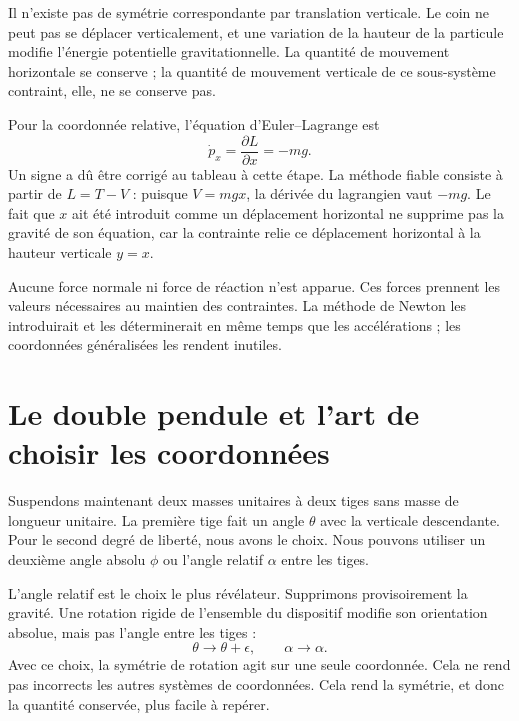 Il n’existe pas de symétrie correspondante par translation verticale. Le coin ne peut pas se déplacer verticalement, et une variation de la hauteur de la particule modifie l’énergie potentielle gravitationnelle. La quantité de mouvement horizontale se conserve ; la quantité de mouvement verticale de ce sous-système contraint, elle, ne se conserve pas.

Pour la coordonnée relative, l’équation d’Euler--Lagrange est
\begin{equation}
  \dot p_x=\frac{\partial L}{\partial x}=-mg.
  \label{eq:l6-wedge-force}
\end{equation}
Un signe a dû être corrigé au tableau à cette étape. La méthode fiable consiste à partir de \(L=T-V\) : puisque \(V=mgx\), la dérivée du lagrangien vaut \(-mg\). Le fait que \(x\) ait été introduit comme un déplacement horizontal ne supprime pas la gravité de son équation, car la contrainte relie ce déplacement horizontal à la hauteur verticale \(y=x\).

Aucune force normale ni force de réaction n’est apparue. Ces forces prennent les valeurs nécessaires au maintien des contraintes. La méthode de Newton les introduirait et les déterminerait en même temps que les accélérations ; les coordonnées généralisées les rendent inutiles.

\section{Le double pendule et l’art de choisir les coordonnées}

Suspendons maintenant deux masses unitaires à deux tiges sans masse de longueur unitaire. La première tige fait un angle \(\theta\) avec la verticale descendante. Pour le second degré de liberté, nous avons le choix. Nous pouvons utiliser un deuxième angle absolu \(\phi\) ou l’angle relatif \(\alpha\) entre les tiges.

L’angle relatif est le choix le plus révélateur. Supprimons provisoirement la gravité. Une rotation rigide de l’ensemble du dispositif modifie son orientation absolue, mais pas l’angle entre les tiges :
\begin{equation}
  \theta\longrightarrow\theta+\epsilon,
  \qquad
  \alpha\longrightarrow\alpha.
  \label{eq:l6-double-rotation}
\end{equation}
Avec ce choix, la symétrie de rotation agit sur une seule coordonnée. Cela ne rend pas incorrects les autres systèmes de coordonnées. Cela rend la symétrie, et donc la quantité conservée, plus facile à repérer.

